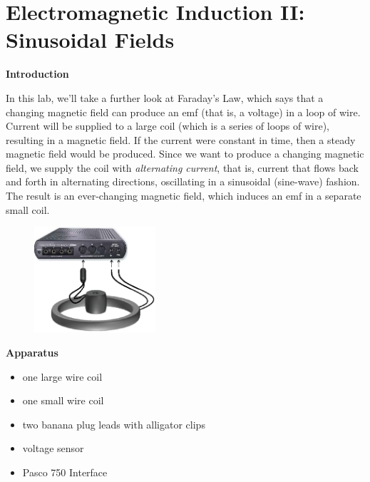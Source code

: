 
\section{Electromagnetic Induction II: Sinusoidal Fields}

\makelabheader %

\bigskip

\textbf{Introduction}

In this lab, we'll take a further look at Faraday's Law, which says
that a changing magnetic field can produce an emf (that is, a voltage)
in a loop of wire.  Current will be supplied to a large coil (which is a 
series of loops of wire), resulting in a magnetic field.  
If the current were constant in time,
then a steady magnetic field would be produced.  Since we want to
produce a changing magnetic field, we supply the coil with {\it
alternating current}, that is, current that flows back and forth in
alternating directions, oscillating in a sinusoidal (sine-wave) fashion.  The
result is an ever-changing magnetic field, which induces an emf in
a separate small coil.

\begin{figure}
    \includegraphics[width=0.4\textwidth]{induction2/induction2_setup.eps}
\end{figure}

\bigskip

\textbf{Apparatus}
\begin{itemize}
\setlength\itemsep{-2pt}
\setlength\topsep{-6pt}
\setlength\partopsep{-6pt}
\vspace{-0.15in}  %
\item one large wire coil
\item one small wire coil
\item two banana plug leads with alligator clips
\item voltage sensor
\item Pasco 750 Interface
\end{itemize}

